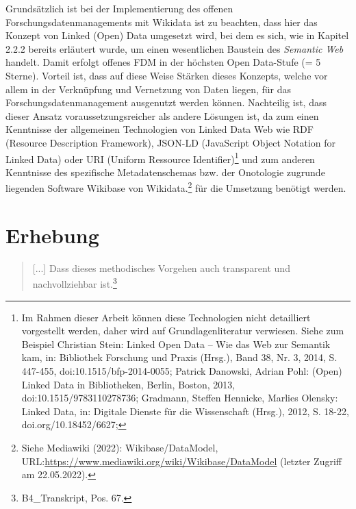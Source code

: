 Grundsätzlich ist bei der Implementierung des offenen Forschungsdatenmanagements mit Wikidata ist zu beachten, dass hier das Konzept von Linked (Open) Data umgesetzt wird, bei dem es sich, wie in Kapitel 2.2.2 bereits erläutert wurde, um einen wesentlichen Baustein des \textit{Semantic Web} handelt. Damit erfolgt offenes FDM in der höchsten Open Data-Stufe (= 5 Sterne). Vorteil ist, dass auf diese Weise Stärken dieses Konzepts, welche vor allem in der Verknüpfung und Vernetzung von Daten liegen, für das Forschungsdatenmanagement ausgenutzt werden können. Nachteilig ist, dass dieser Ansatz voraussetzungsreicher als andere Lösungen ist, da zum einen Kenntnisse der allgemeinen Technologien von Linked Data Web wie RDF (Resource Description Framework), JSON-LD (JavaScript Object Notation for Linked Data) oder URI (Uniform Ressource Identifier)\footnote{Im Rahmen dieser Arbeit können diese Technologien nicht detailliert vorgestellt werden, daher wird auf Grundlagenliteratur verwiesen. Siehe zum Beispiel Christian Stein: Linked Open Data – Wie das Web zur Semantik kam, in: Bibliothek Forschung und Praxis (Hrsg.), Band 38, Nr. 3, 2014, S. 447-455, doi:10.1515/bfp-2014-0055; Patrick Danowski, Adrian Pohl: (Open) Linked Data in Bibliotheken, Berlin, Boston, 2013, doi:10.1515/9783110278736; Gradmann, Steffen Hennicke, Marlies Olensky: Linked Data, in: Digitale Dienste für die Wissenschaft (Hrsg.), 2012, S. 18-22, doi.org/10.18452/6627;  } und zum anderen Kenntnisse des spezifische Metadatenschemas bzw. der Onotologie zugrunde liegenden Software Wikibase von Wikidata.\footnote{Siehe Mediawiki (2022): Wikibase/DataModel, URL:\url{https://www.mediawiki.org/wiki/Wikibase/DataModel} (letzter Zugriff am 22.05.2022).} für die Umsetzung benötigt werden.

\section{Erhebung}

\begin{quote}
    [...] Dass dieses methodisches Vorgehen auch transparent und nachvollziehbar ist.\footnote{B4\_Transkript, Pos. 67.}
\end{quote}

